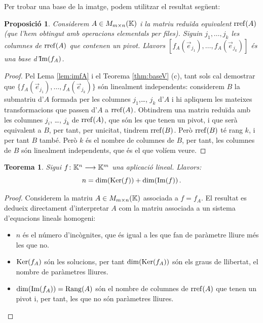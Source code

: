 \documentclass[
  11pt,
]{book}
\numberwithin{dummy}{section}
\theoremstyle{maincolornumbox}
\newtheorem{theorem}{TTTT}[chapter]
\newtheorem{theoremeT}{Teorema}[chapter]
\theoremstyle{blacknumex}
\theoremstyle{blacknumbox}
\theoremstyle{maincolornum}
\newtheorem{propositionT}{Proposició}[chapter]
\renewenvironment{theorem}{\begin{tBox}\begin{theoremeT}}{\end{theoremeT}\end{tBox}}
\newenvironment{proposition}{\begin{pBox}\begin{propositionT}}{\end{propositionT}\end{pBox}}
\begin{document}
Per trobar una base de la imatge, podem utilitzar el resultat següent:

\begin{proposition}
Considerem \(A\in M_{m\times n}(\mathbb{K})\) i la matriu reduïda equivalent
\(\operatorname{rref}(A)\) (que l'hem obtingut amb operacions elementals per files).
Siguin \(j_1, \dots , j_k\) les columnes de \(\operatorname{rref}(A)\) que contenen un
pivot. Llavors \([f_A(\vec e_{j_1}), \dots, f_A(\vec e_{j_k})]\) és una
base d'\(\operatorname{Im}(f_A)\).
\end{proposition}

\begin{proof}
Pel Lema \ref{lem:imfA} i el Teorema
\ref{thm:baseV}
(c), tant sols cal demostrar que
\(\{f_A(\vec e_{j_1}), \dots, f_A(\vec e_{j_k})\}\) són linealment
independents: considerem \(B\) la submatriu d'\(A\) formada per les columnes
\(j_1\),\ldots, \(j_k\) d'\(A\) i hi apliquem les mateixes transformacions que
passen d'\(A\) a \(\operatorname{rref}(A)\). Obtindrem una matriu reduïda amb les columnes
\(j_i\), \ldots, \(j_k\) de \(\operatorname{rref}(A)\), que són les que tenen un pivot, i que
serà equivalent a \(B\), per tant, per unicitat, tindrem \(\operatorname{rref}(B)\). Però
\(\operatorname{rref}(B)\) té rang \(k\), i per tant \(B\) també. Però \(k\) és el nombre de
columnes de \(B\), per tant, les columnes de \(B\) són linealment
independents, que és el que volíem veure.
\end{proof}

\begin{theorem}
\protect\hypertarget{thm:ker-ima}{}\label{thm:ker-ima}Sigui \(f\colon \mathbb{K}^n\longrightarrow \mathbb{K}^m\) una
aplicació lineal. Llavors: \[n=\dim(\operatorname{Ker}(f))+\dim(\operatorname{Im}(f)) \,.\]
\end{theorem}

\begin{proof}

Considerem la matriu \(A\in M_{m\times n}(\mathbb{K})\) associada a
\(f=f_A\). El resultat es dedueix directament d'interpretar \(A\) com la
matriu associada a un sistema d'equacions lineals homogeni:

\begin{itemize}
\item
  \(n\) és el número d'incògnites, que és igual a les que fan de
  paràmetre lliure més les que no.
\item
  \(\operatorname{Ker}(f_A)\) són les solucions, per tant \(\dim(\operatorname{Ker}(f_A))\) són els
  graus de llibertat, el nombre de paràmetres lliures.
\item
  \(\dim(\operatorname{Im}(f_A))=\operatorname{Rang}(A)\) són el nombre de columnes de \(\operatorname{rref}(A)\)
  que tenen un pivot i, per tant, les que no són paràmetres lliures.
\end{itemize}

\end{proof}
\end{document}
